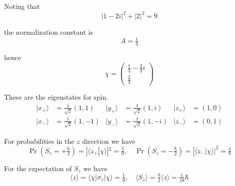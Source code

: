 


\bigskip
Noting that
\begin{equation*}
|1-2i|^2+|2|^2=9
\end{equation*}

the normalization constant is
\begin{equation*}
A=\tfrac{1}{3}
\end{equation*}

hence
\begin{equation*}
\chi=\begin{pmatrix}\frac{1}{3}-\frac{2}{3}i\\[1ex]\frac{2}{3}\end{pmatrix}
\end{equation*}

These are the eigenstates for spin.
\begin{align*}
|x_+\rangle&=\tfrac{1}{\sqrt2}(1,1) &
|y_+\rangle&=\tfrac{1}{\sqrt2}(1,i) &
|z_+\rangle&=(1,0)
\\
|x_-\rangle&=\tfrac{1}{\sqrt2}(1,-1) &
|y_-\rangle&=\tfrac{1}{\sqrt2}(1,-i) &
|z_-\rangle&=(0,1)
\end{align*}

For probabilities in the $z$ direction we have
\begin{equation*}
\Pr\left(S_z=+\tfrac{\hbar}{2}\right)=|\langle z_+|\chi\rangle|^2=\tfrac{5}{9},\quad
\Pr\left(S_z=-\tfrac{\hbar}{2}\right)=|\langle z_-|\chi\rangle|^2=\tfrac{4}{9}
\end{equation*}

For the expectation of $S_z$ we have
\begin{equation*}
\langle z\rangle=\langle\chi|\sigma_z|\chi\rangle=\tfrac{1}{9},\quad
\langle S_z\rangle=\tfrac{\hbar}{2}\langle z\rangle=\tfrac{1}{18}\hbar
\end{equation*}

